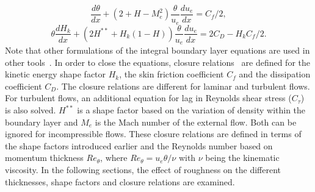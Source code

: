 \begin{equation}
\frac{d\theta}{dx} + (2+H-M_e^2)\frac{\theta}{u_e}\frac{du_e}{dx} = C_f/2,
\end{equation}
\begin{equation}
\theta\frac{dH_k}{dx} + (2H^{**} + H_k(1-H))\frac{\theta}{u_e}\frac{du_e}{dx}= 2C_D-H_kC_f/2.
\end{equation}
Note that other formulations of the integral boundary layer equations are used in other tools~\cite{Ozdemir2020}. In order to close the equations, closure relations~\cite{drela1986two,Ozdemir2020} are defined for the kinetic energy shape factor $H_k$, the skin friction coefficient $C_f$ and the dissipation coefficient $C_D$. The closure relations are different for laminar and turbulent flows. For turbulent flows, an additional equation for lag in Reynolds shear stress ($C_{\tau}$) is also solved. $H^{**}$ is a shape factor based on the variation of density within the boundary layer and $M_e$ is the Mach number of the external flow. Both can be ignored for incompressible flows. These closure relations are defined in terms of the shape factors introduced earlier and the Reynolds number based on momentum thickness $Re_{\theta}$,  where $Re_{\theta} = u_e \theta/\nu$ with $\nu$ being the kinematic viscosity. In the following sections, the effect of roughness on the different thicknesses, shape factors and closure relations are examined.
